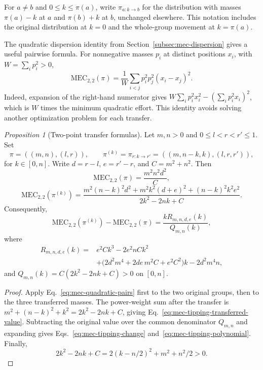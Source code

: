 \documentclass{article}
\theoremstyle{plain}
\theoremstyle{remark}
\newtheorem{proposition}{Proposition}
\begin{document}
For $a\neq b$ and $0\leq k\leq\pi(a)$, write $\pi_{a:k\to b}$ for the distribution with masses $\pi(a)-k$ at $a$ and $\pi(b)+k$ at $b$, unchanged elsewhere. This notation includes the original distribution at $k=0$ and the whole-group movement at $k=\pi(a)$.

The quadratic dispersion identity from Section~\ref{subsec:mec-dispersion} gives a useful pairwise formula. For nonnegative masses $p_i$ at distinct positions $x_i$, with $W=\sum_i p_i^2>0$,
\begin{equation}\label{eq:mec-quadratic-pairs}
\mathrm{MEC}_{2,2}(\pi)
=\frac{1}{W}\sum_{i<j}p_i^2p_j^2(x_i-x_j)^2.
\end{equation}
Indeed, expansion of the right-hand numerator gives $W\sum_i p_i^2x_i^2-(\sum_i p_i^2x_i)^2$, which is $W$ times the minimum quadratic effort. This identity avoids solving another optimization problem for each transfer.

\begin{proposition}[Two-point transfer formulas]\label{prop:mec-tipping-formulas}
Let $m,n>0$ and $0\leq l<r<r'\leq1$. Set
\[
\pi=((m,n),(l,r)),\qquad
\pi^{(k)}=\pi_{r:k\to r'}=((m,n-k,k),(l,r,r')),
\]
for $k\in[0,n]$. Write $d=r-l$, $e=r'-r$, and $C=m^2+n^2$. Then
\[
\mathrm{MEC}_{2,2}(\pi)=\frac{m^2n^2d^2}{C},
\]
\begin{equation}\label{eq:mec-tipping-transferred-value}
\mathrm{MEC}_{2,2}(\pi^{(k)})
=\frac{m^2(n-k)^2d^2+m^2k^2(d+e)^2+(n-k)^2k^2e^2}
       {2k^2-2nk+C}.
\end{equation}
Consequently,
\begin{equation}\label{eq:mec-tipping-change}
\mathrm{MEC}_{2,2}(\pi^{(k)})-\mathrm{MEC}_{2,2}(\pi)
=\frac{kR_{m,n,d,e}(k)}{Q_{m,n}(k)},
\end{equation}
where
\begin{equation}\label{eq:mec-tipping-polynomial}
\begin{aligned}
R_{m,n,d,e}(k)
={}&e^2Ck^3-2e^2nCk^2\\
 &+\bigl(2d^2m^4+2de\,m^2C+e^2C^2\bigr)k-2d^2m^4n,
\end{aligned}
\end{equation}
and $Q_{m,n}(k)=C(2k^2-2nk+C)>0$ on $[0,n]$.
\end{proposition}
\begin{proof}
Apply Eq.~\eqref{eq:mec-quadratic-pairs} first to the two original groups, then to the three transferred masses. The power-weight sum after the transfer is $m^2+(n-k)^2+k^2=2k^2-2nk+C$, giving Eq.~\eqref{eq:mec-tipping-transferred-value}. Subtracting the original value over the common denominator $Q_{m,n}$ and expanding gives Eqs.~\eqref{eq:mec-tipping-change} and~\eqref{eq:mec-tipping-polynomial}. Finally,
\[
2k^2-2nk+C=2(k-n/2)^2+m^2+n^2/2>0.
\]
\end{proof}
\end{document}
